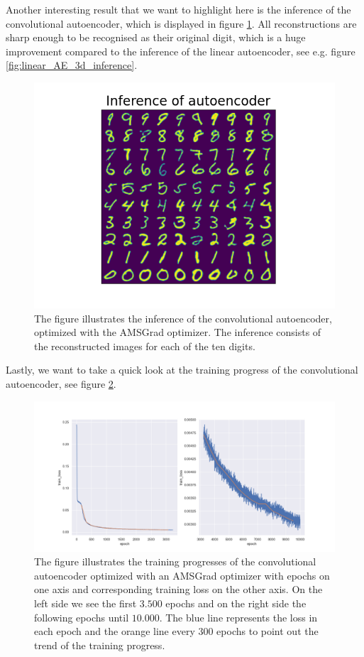 Another interesting result that we want to highlight here is the inference of the convolutional autoencoder, which is displayed in figure \ref{fig:convolutional_AE_inference}. All reconstructions are sharp enough to be recognised as their original digit, which is a huge improvement compared to the inference of the linear autoencoder, see e.g. figure \ref{fig:linear_AE_3d_inference}.


\begin{figure}
\begin{center}
\includegraphics[width=0.7\linewidth]{convolutional_AE_inference}
\end{center}
\caption{The figure illustrates the inference of the convolutional autoencoder, optimized with the AMSGrad optimizer. The inference consists of the reconstructed images for each of the ten digits.}\label{fig:convolutional_AE_inference}
\end{figure}


Lastly, we want to take a quick look at the training progress of the convolutional autoencoder, see figure \ref{fig:convolutional_AE_training_progress}.

\begin{figure}
\begin{center}
\includegraphics[width=\linewidth]{convolutional_AE_training_progress}
\end{center}
\caption{The figure illustrates the training progresses of the convolutional autoencoder optimized with an AMSGrad optimizer  with epochs on one axis and corresponding training loss on the other axis. On the left side we see the first $3.500$ epochs and on the right side the following epochs until $10.000$. The blue line represents the loss in each epoch and the orange line every $300$ epochs to point out the trend of the training progress.}\label{fig:convolutional_AE_training_progress}
\end{figure}
